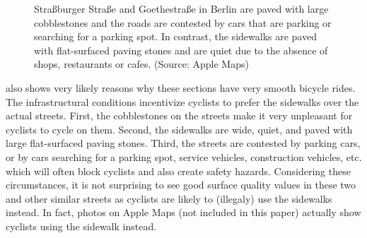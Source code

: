 \begin{figure}[t]
    \centering
    \hfill
    \caption{%
        Straßburger Straße and Goethestraße in Berlin are paved with large cobblestones and the roads are contested by cars that are parking or searching for a parking spot. In contrast, the sidewalks are paved with flat-surfaced paving stones and are quiet due to the absence of shops, restaurants or cafes. (Source: Apple Maps)
    }%
    \label{fig:sidewalk}
    \vspace{-.5em}
\end{figure}

 also shows very likely reasons why these sections have very smooth bicycle rides.
The infrastructural conditions incentivize cyclists to prefer the sidewalks over the actual streets.
First, the cobblestones on the streets make it very unpleasant for cyclists to cycle on them.
Second, the sidewalks are wide, quiet, and paved with large flat-surfaced paving stones.
Third, the streets are contested by parking cars, or by cars searching for a parking spot, service vehicles, construction vehicles, etc. which will often block cyclists and also create safety hazards.
Considering these circumstances, it is not surprising to see good surface quality values in these two and other similar streets as cyclists are likely to (illegaly) use the sidewalks instead.
In fact, photos on Apple Maps (not included in this paper) actually show cyclists using the sidewalk instead.

\begin{table}%
\centering
\caption{Surface Quality Analysis Evaluation Results Showing Mean, Median and Standard Deviation of Sections With (Seemingly) Confusing Results}%
\label{tab:mismatch}
\end{table}

